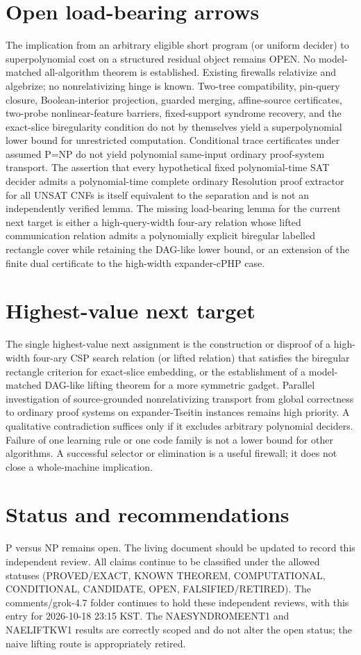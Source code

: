 \documentclass[11pt]{article}
\begin{document}
\section{Open load-bearing arrows}
The implication from an arbitrary eligible short program (or uniform decider) to superpolynomial cost on a structured residual object remains OPEN. No model-matched all-algorithm theorem is established. Existing firewalls relativize and algebrize; no nonrelativizing hinge is known. Two-tree compatibility, pin-query closure, Boolean-interior projection, guarded merging, affine-source certificates, two-probe nonlinear-feature barriers, fixed-support syndrome recovery, and the exact-slice biregularity condition do not by themselves yield a superpolynomial lower bound for unrestricted computation. Conditional trace certificates under assumed P=NP do not yield polynomial same-input ordinary proof-system transport. The assertion that every hypothetical fixed polynomial-time SAT decider admits a polynomial-time complete ordinary Resolution proof extractor for all UNSAT CNFs is itself equivalent to the separation and is not an independently verified lemma. The missing load-bearing lemma for the current next target is either a high-query-width four-ary relation whose lifted communication relation admits a polynomially explicit biregular labelled rectangle cover while retaining the DAG-like lower bound, or an extension of the finite dual certificate to the high-width expander-cPHP case.

\section{Highest-value next target}
The single highest-value next assignment is the construction or disproof of a high-width four-ary CSP search relation (or lifted relation) that satisfies the biregular rectangle criterion for exact-slice embedding, or the establishment of a model-matched DAG-like lifting theorem for a more symmetric gadget. Parallel investigation of source-grounded nonrelativizing transport from global correctness to ordinary proof systems on expander-Tseitin instances remains high priority. A qualitative contradiction suffices only if it excludes arbitrary polynomial deciders. Failure of one learning rule or one code family is not a lower bound for other algorithms. A successful selector or elimination is a useful firewall; it does not close a whole-machine implication.

\section{Status and recommendations}
P versus NP remains open. The living document should be updated to record this independent review. All claims continue to be classified under the allowed statuses (PROVED/EXACT, KNOWN THEOREM, COMPUTATIONAL, CONDITIONAL, CANDIDATE, OPEN, FALSIFIED/RETIRED). The comments/grok-4.7 folder continues to hold these independent reviews, with this entry for 2026-10-18 23:15 KST. The NAESYNDROMEENT1 and NAELIFTKW1 results are correctly scoped and do not alter the open status; the naive lifting route is appropriately retired.

\end{document}
